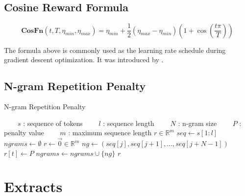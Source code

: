 \subsection{Cosine Reward Formula}

\begin{equation}
\label{eqn:cosine-lr}
\textbf{CosFn}(t, T, \eta_{min}, \eta_{max}) = \eta_{min} + \frac{1}{2}(\eta_{max} - \eta_{min})(1 + \cos(\frac{t\pi}{T}))
\end{equation}

The formula above is commonly used as the learning rate schedule during gradient descent optimization. It was introduced by \cite{loshchilov2017sgdrstochasticgradientdescent}.

\subsection{N-gram Repetition Penalty}

\begin{algorithm}[H]
\caption{N-gram Repetition Penalty}\label{alg:reward-repetition-penalty}
\begin{algorithmic}[1]
    \STATE \ \ \ \ $s$ : sequence of tokens
    \STATE \ \ \ \ $l$ : sequence length
    \STATE \ \ \ \ $N$ : n-gram size
    \STATE \ \ \ \ $P$ : penalty value
    \STATE \ \ \ \ $m$ : maximum sequence length
     $r \in \mathbb{R}^m$
    \STATE $seq \gets s[1:l]$ 
    \STATE $ngrams \gets \emptyset$ 
    \STATE $r \gets \vec{0} \in \mathbb{R}^m$ 
        \STATE $ng \gets (seq[j], seq[j+1], ..., seq[j+N-1])$ 
                \STATE $r[t] \gets P$ 
            \ENDFOR
        \ENDIF
        \STATE $ngrams \gets ngrams \cup \{ng\}$
    \ENDFOR
     $r$
\end{algorithmic}
\end{algorithm}

\newpage
\section{Extracts}

